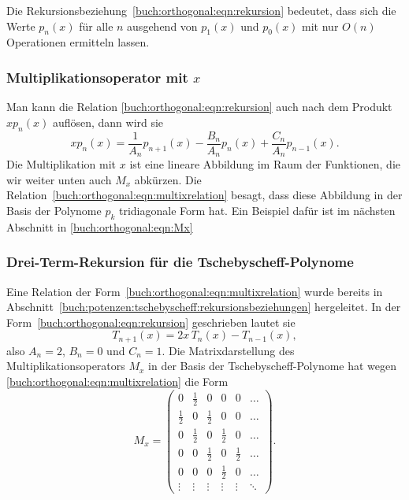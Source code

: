 Die Rekursionsbeziehung~\eqref{buch:orthogonal:eqn:rekursion} bedeutet,
dass sich die Werte $p_n(x)$ für alle $n$ ausgehend von $p_1(x)$ und
$p_0(x)$ mit nur $O(n)$ Operationen ermitteln lassen.

\subsubsection{Multiplikationsoperator mit $x$}
Man kann die Relation \eqref{buch:orthogonal:eqn:rekursion}
auch nach dem Produkt $xp_n(x)$ auflösen, dann wird sie
\begin{equation}
xp_n(x)
=
\frac{1}{A_n}p_{n+1}(x)
-
\frac{B_n}{A_n}p_n(x)
+
\frac{C_n}{A_n}p_{n-1}(x).
\label{buch:orthogonal:eqn:multixrelation}
\end{equation}
Die Multiplikation mit $x$ ist eine lineare Abbildung im Raum der Funktionen,
die wir weiter unten auch $M_x$ abkürzen.
Die Relation~\eqref{buch:orthogonal:eqn:multixrelation} besagt, dass diese
Abbildung in der Basis der Polynome $p_k$ tridiagonale Form hat.
Ein Beispiel dafür ist im nächsten Abschnitt in
\eqref{buch:orthogonal:eqn:Mx}

\subsubsection{Drei-Term-Rekursion für die Tschebyscheff-Polynome}
Eine Relation der Form~\eqref{buch:orthogonal:eqn:multixrelation}
wurde bereits in 
Abschnitt~\ref{buch:potenzen:tschebyscheff:rekursionsbeziehungen}
hergeleitet.
In der Form~\eqref{buch:orthogonal:eqn:rekursion} geschrieben lautet
sie
\[
T_{n+1}(x) = 2x\,T_n(x)-T_{n-1}(x),
\]
also
$A_n=2$, $B_n=0$ und $C_n=1$.
Die Matrixdarstellung des Multiplikationsoperators $M_x$ in der
Basis der Tschebyscheff-Polynome hat wegen
\eqref{buch:orthogonal:eqn:multixrelation} die Form
\begin{equation}
M_x
=
\begin{pmatrix}
      0&\frac12&      0&      0&      0&\dots  \\
\frac12&      0&\frac12&      0&      0&\dots  \\
      0&\frac12&      0&\frac12&      0&\dots  \\
      0&      0&\frac12&      0&\frac12&\dots  \\
      0&      0&      0&\frac12&      0&\dots  \\
 \vdots& \vdots& \vdots& \vdots& \vdots&\ddots 
\end{pmatrix}.
\label{buch:orthogonal:eqn:Mx}
\end{equation}

